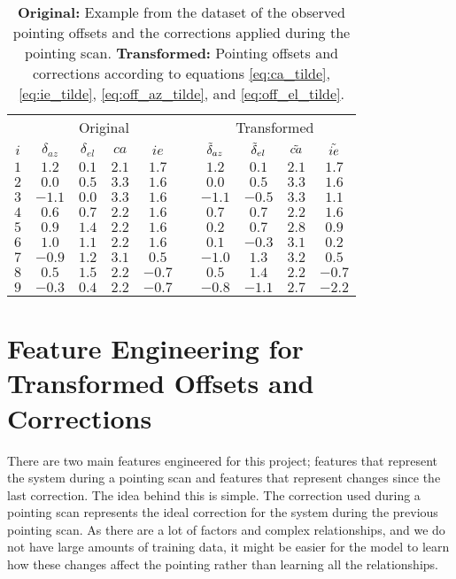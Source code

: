 \begin{table}[H]
    \centering
    \caption[Original and transformed pointing offsets and corrections]{\textbf{Original:} Example from the dataset of the observed pointing offsets and the corrections applied during the pointing scan.
    \textbf{Transformed:} Pointing offsets and corrections according to equations \eqref{eq:ca_tilde}, \eqref{eq:ie_tilde}, \eqref{eq:off_az_tilde}, and \eqref{eq:off_el_tilde}.}
    \label{tab:offset_and_corrections}
    \begin{tabular}{c cccc c cccc}
    \toprule
    \multicolumn{1}{c}{} & \multicolumn{4}{c}{Original} & \multicolumn{1}{c}{} & \multicolumn{4}{c}{Transformed} \\
    \cmidrule(lr){2-5} \cmidrule(lr){7-10} 
    $i$ &  $\delta_{az}$ &  $\delta_{el}$ &  $ca$ & $ie$  & & $\Tilde{\delta}_{az}$ &  $\Tilde{\delta}_{el}$ &  $\Tilde{ca}$ &  $\Tilde{ie}$ \\
    \midrule
    $1$ &     $1.2$ & $0.1$ & $2.1$ &  $1.7$ &   &    $1.2$ &       $0.1$ &       $2.1$ &       $1.7$ \\
    $2$ &     $0.0$ & $0.5$ & $3.3$ &  $1.6$ &   &    $0.0$ &       $0.5$ &       $3.3$ &       $1.6$ \\
    $3$ &    $-1.1$ & $0.0$ & $3.3$ &  $1.6$ &   &   $-1.1$ &      $-0.5$ &       $3.3$ &       $1.1$ \\
    $4$ &     $0.6$ & $0.7$ & $2.2$ &  $1.6$ &   &    $0.7$ &       $0.7$ &       $2.2$ &       $1.6$ \\
    $5$ &     $0.9$ & $1.4$ & $2.2$ &  $1.6$ &   &    $0.2$ &       $0.7$ &       $2.8$ &       $0.9$ \\
    $6$ &     $1.0$ & $1.1$ & $2.2$ &  $1.6$ &   &    $0.1$ &      $-0.3$ &       $3.1$ &       $0.2$ \\
    $7$ &    $-0.9$ & $1.2$ & $3.1$ &  $0.5$ &   &   $-1.0$ &       $1.3$ &       $3.2$ &       $0.5$ \\
    $8$ &     $0.5$ & $1.5$ & $2.2$ & $-0.7$ &   &    $0.5$ &       $1.4$ &       $2.2$ &      $-0.7$ \\
    $9$ &    $-0.3$ & $0.4$ & $2.2$ & $-0.7$ &   &   $-0.8$ &      $-1.1$ &       $2.7$ &      $-2.2$ \\
    \bottomrule
    \end{tabular}
\end{table}

\section{Feature Engineering for Transformed Offsets and Corrections}
There are two main features engineered for this project; features that represent the system during a pointing scan and features that represent changes since the last correction. 
The idea behind this is simple. The correction used during a pointing scan represents the ideal correction for the system during the previous pointing scan.
As there are a lot of factors and complex relationships, and we do not have large amounts of training data, it might be easier for the model to learn 
how these changes affect the pointing rather than learning all the relationships.

